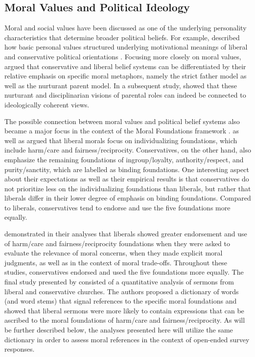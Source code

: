 \documentclass[12pt]{paper}
\begin{document}
\subsection{Moral Values and Political Ideology}

Moral and social values have been discussed as one of the underlying personality characteristics that determine broader political beliefs. For example, \citet{piurko2011basic} described how basic personal values structured underlying motivational meanings of liberal and conservative political orientations \citep[see also][]{schwartz2010basic,schwartz2011basic}. Focusing more closely on moral values, \citet{lakoff1995metaphor} argued that conservative and liberal belief systems can be differentiated by their relative emphasis on specific moral metaphors, namely the strict father model as well as the nurturant parent model. In a subsequent study, \citet{barker2006competing} showed that these nurturant and disciplinarian visions of parental roles can indeed be connected to ideologically coherent views.

The possible connection between moral values and political belief systems also became a major focus in the context of the Moral Foundations framework \citep[c.f.][]{haidt2012righteous}. \citet{haidt2007morality} as well as \citet{graham2009liberals} argued that liberal morals focus on individualizing foundations, which include harm/care and fairness/reciprocity. Conservatives, on the other hand, also emphasize the remaining foundations of ingroup/loyalty, authority/respect, and purity/sanctity, which are labelled as binding foundations. One interesting aspect about their expectations as well as their empirical results is that conservatives do not prioritize less on the individualizing foundations than liberals, but rather that liberals differ in their lower degree of emphasis on binding foundations. Compared to liberals, conservatives tend to endorse and use the five foundations more equally.

\citet{graham2009liberals} demonstrated in their analyses that liberals showed greater endorsement and use of harm/care and fairness/reciprocity foundations when they were asked to evaluate the relevance of moral concerns, when they made explicit moral judgments, as well as in the context of moral trade-offs. Throughout these studies, conservatives endorsed and used the five foundations more equally. The final study presented by \citet{graham2009liberals} consisted of a quantitative analysis of sermons from liberal and conservative churches. The authors proposed a dictionary of words (and word stems) that signal references to the specific moral foundations and showed that liberal sermons were more likely to contain expressions that can be ascribed to the moral foundations of harm/care and fairness/reciprocity. As will be further described below, the analyses presented here will utilize the same dictionary in order to assess moral references in the context of open-ended survey responses.
\end{document}

